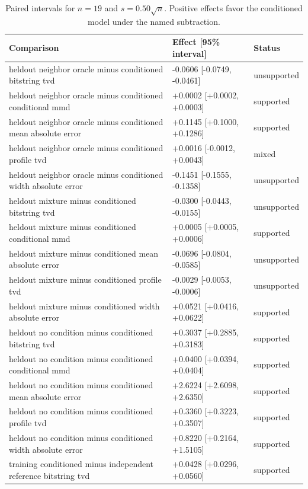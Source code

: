 \begin{table}[p]
\centering
\scriptsize
\setlength{\tabcolsep}{4pt}
\caption{Paired intervals for $n=19$ and $s=0.50\sqrt n$. Positive effects favor the conditioned model under the named subtraction.}
\label{tab:all-intervals-n19-w0.50}
\begin{tabular}{@{}p{}p{}p{}@{}}
\toprule
Comparison & Effect [95\% interval] & Status\\
\midrule
heldout neighbor oracle minus conditioned bitstring tvd & -0.0606 [-0.0749, -0.0461] & unsupported \\
heldout neighbor oracle minus conditioned conditional mmd & +0.0002 [+0.0002, +0.0003] & supported \\
heldout neighbor oracle minus conditioned mean absolute error & +0.1145 [+0.1000, +0.1286] & supported \\
heldout neighbor oracle minus conditioned profile tvd & +0.0016 [-0.0012, +0.0043] & mixed \\
heldout neighbor oracle minus conditioned width absolute error & -0.1451 [-0.1555, -0.1358] & unsupported \\
heldout mixture minus conditioned bitstring tvd & -0.0300 [-0.0443, -0.0155] & unsupported \\
heldout mixture minus conditioned conditional mmd & +0.0005 [+0.0005, +0.0006] & supported \\
heldout mixture minus conditioned mean absolute error & -0.0696 [-0.0804, -0.0585] & unsupported \\
heldout mixture minus conditioned profile tvd & -0.0029 [-0.0053, -0.0006] & unsupported \\
heldout mixture minus conditioned width absolute error & +0.0521 [+0.0416, +0.0622] & supported \\
heldout no condition minus conditioned bitstring tvd & +0.3037 [+0.2885, +0.3183] & supported \\
heldout no condition minus conditioned conditional mmd & +0.0400 [+0.0394, +0.0404] & supported \\
heldout no condition minus conditioned mean absolute error & +2.6224 [+2.6098, +2.6350] & supported \\
heldout no condition minus conditioned profile tvd & +0.3360 [+0.3223, +0.3507] & supported \\
heldout no condition minus conditioned width absolute error & +0.8220 [+0.2164, +1.5105] & supported \\
training conditioned minus independent reference bitstring tvd & +0.0428 [+0.0296, +0.0560] & supported \\

\end{tabular}
\end{table}
